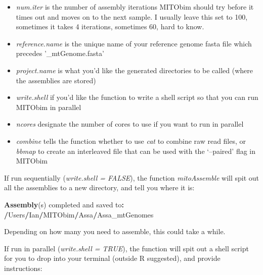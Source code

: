 \documentclass[
]{article}
\newenvironment{Shaded}{\begin{snugshade}}{\end{snugshade}}
\newcommand{\ErrorTok}[1]{\textcolor[rgb]{0.64,0.00,0.00}{\textbf{#1}}}
\newcommand{\KeywordTok}[1]{\textcolor[rgb]{0.13,0.29,0.53}{\textbf{#1}}}
\newcommand{\NormalTok}[1]{#1}
\newcommand{\OperatorTok}[1]{\textcolor[rgb]{0.81,0.36,0.00}{\textbf{#1}}}
\newcommand{\StringTok}[1]{\textcolor[rgb]{0.31,0.60,0.02}{#1}}
\providecommand{\tightlist}{%
  \setlength{\itemsep}{0pt}\setlength{\parskip}{0pt}}
\begin{document}
\begin{itemize}
\tightlist
\item
  \emph{num.iter} is the number of assembly iterations MITObim should
  try before it times out and moves on to the next sample. I usually
  leave this set to 100, sometimes it takes 4 iterations, sometimes 60,
  hard to know.\\
\item
  \emph{reference.name} is the unique name of your reference genome
  fasta file which precedes '\_mtGenome.fasta'\\
\item
  \emph{project.name} is what you'd like the generated directories to be
  called (where the assemblies are stored)
\item
  \emph{write.shell} if you'd like the function to write a shell script
  so that you can run MITObim in parallel
\item
  \emph{ncores} designate the number of cores to use if you want to run
  in parallel
\item
  \emph{combine} tells the function whether to use \emph{cat} to combine
  raw read files, or \emph{bbmap} to create an interleaved file that can
  be used with the `--paired' flag in MITObim
\end{itemize}

If run sequentially (\emph{write.shell = FALSE}), the function
\emph{mitoAssemble} will spit out all the assemblies to a new directory,
and tell you where it is:

\begin{Shaded}
\begin{Highlighting}[]
\KeywordTok{Assembly}\NormalTok{(s) completed and saved to}\OperatorTok{:}\StringTok{ }\ErrorTok{/}\NormalTok{Users}\OperatorTok{/}\NormalTok{Ian}\OperatorTok{/}\NormalTok{MITObim}\OperatorTok{/}\NormalTok{Assa}\OperatorTok{/}\NormalTok{Assa_mtGenomes}
\end{Highlighting}
\end{Shaded}

Depending on how many you need to assemble, this could take a while.

If run in parallel (\emph{write.shell = TRUE}), the function will spit
out a shell script for you to drop into your terminal (outside R
suggested), and provide instructions:
\end{document}
